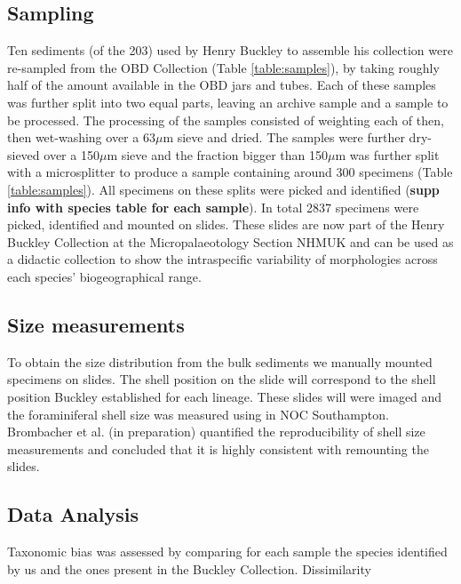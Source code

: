 \documentclass[a4paper]{article}
\begin{document}
	\subsection{Sampling}
Ten sediments (of the 203) used by Henry Buckley to assemble his collection were re-sampled from the OBD Collection (Table \ref{table:samples}), by taking roughly half of the amount available in the OBD jars and tubes. Each of these samples was further split into two equal parts, leaving an archive sample and a sample to be processed. The processing of the samples consisted of weighting each of then, then wet-washing over a 63$\mu$m sieve and dried. The samples were further dry-sieved over a 150$\mu$m sieve and the fraction bigger than 150$\mu$m was further split with a microsplitter to produce a sample containing around 300 specimens (Table \ref{table:samples}). All specimens on these splits were picked and identified (\textbf{supp info with species table for each sample}). In total 2837 specimens were picked, identified and mounted on slides. These slides are now part of the Henry Buckley Collection at the Micropalaeotology Section NHMUK and can be used as a didactic collection to show the intraspecific variability of  morphologies across each species' biogeographical range. 


	

	\subsection{Size measurements}
To obtain the size distribution from the bulk sediments we manually mounted specimens on slides. The shell position on the slide will correspond to the shell position Buckley established for each lineage. These slides will were imaged and the foraminiferal shell size was measured using in NOC Southampton. Brombacher et al. (in preparation) quantified the reproducibility of shell size measurements and concluded that it is highly consistent with remounting the slides.


	\subsection{Data Analysis}
Taxonomic bias was assessed by comparing for each sample the species identified by us and the ones present in the Buckley Collection. Dissimilarity 
	
	
\end{document}
